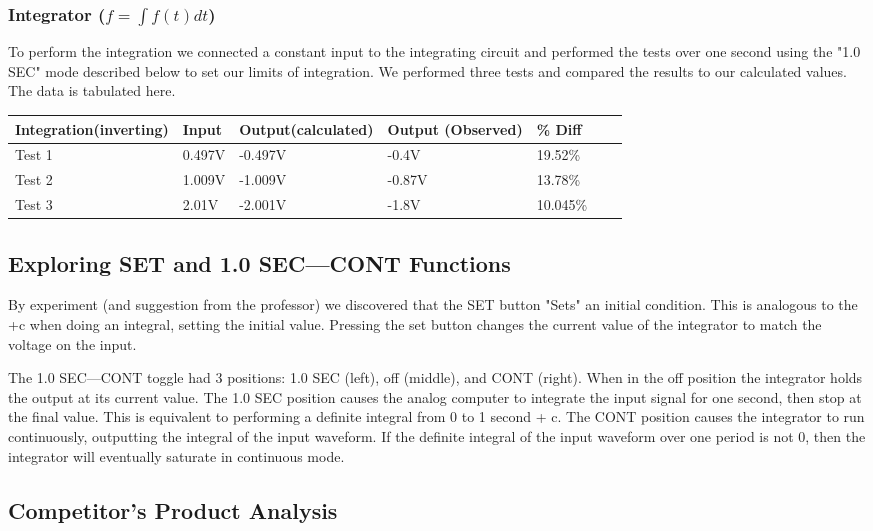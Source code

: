 \documentclass[11pt]{article}
\begin{document}
	\subsubsection*{Integrator ($f=\int$$f(t) {d}t$)}
	To perform the integration we connected a constant input to the integrating circuit and performed the tests over one second using the "1.0 SEC" mode described below to set our limits of integration. We performed three tests and compared the results to our calculated values. The data is tabulated here.
	\begin{table}[h]
		\def\arraystretch{1.2}%
		\begin{tabular}{|l|l|l|l|l|l|l|}
			\hline
			Integration(inverting)	& Input 		& Output(calculated)	& Output (Observed)	 		& \% Diff			\\ \hline
			Test 1					& 0.497V		& -0.497V				& -0.4V						&19.52\%			\\ \hline
			Test 2					& 1.009V		& -1.009V				& -0.87V					&13.78\%			\\ \hline
			Test 3					& 2.01V			& -2.001V				& -1.8V						&10.045\%			\\ \hline
		\end{tabular}
	\end{table}
	
	\subsection*{Exploring SET and 1.0 SEC---CONT Functions}
	By experiment (and suggestion from the professor) we discovered that the SET button "Sets" an initial condition. This is analogous to the +c when doing an integral, setting the initial value. Pressing the set button changes the current value of the integrator to match the voltage on the input.
	
	The 1.0 SEC---CONT toggle had 3 positions: 1.0 SEC (left), off (middle), and CONT (right). When in the off position the integrator holds the output at its current value. The 1.0 SEC position causes the analog computer to integrate the input signal for one second, then stop at the final value. This is equivalent to performing a definite integral from 0 to 1 second + c.
	The CONT position causes the integrator to run continuously, outputting the integral of the input waveform. If the definite integral of the input waveform over one period is not 0, then the integrator will eventually saturate in continuous mode.
	
	\subsection*{Competitor's Product Analysis}
	
\end{document}
